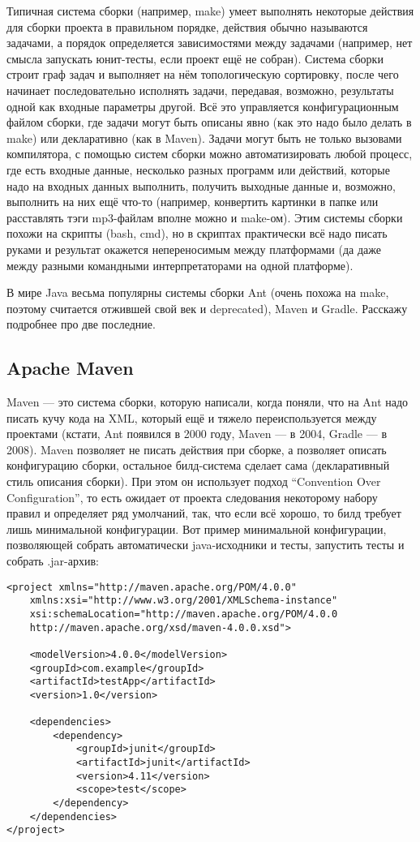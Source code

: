 \documentclass[a5paper]{article}
\begin{document}
Типичная система сборки (например, make) умеет выполнять некоторые действия для сборки проекта в правильном порядке, действия обычно называются задачами, а порядок определяется зависимостями между задачами (например, нет смысла запускать юнит-тесты, если проект ещё не собран). Система сборки строит граф задач и выполняет на нём топологическую сортировку, после чего начинает последовательно исполнять задачи, передавая, возможно, результаты одной как входные параметры другой. Всё это управляется конфигурационным файлом сборки, где задачи могут быть описаны явно (как это надо было делать в make) или декларативно (как в Maven). Задачи могут быть не только вызовами компилятора, с помощью систем сборки можно автоматизировать любой процесс, где есть входные данные, несколько разных программ или действий, которые надо на входных данных выполнить, получить выходные данные и, возможно, выполнить на них ещё что-то (например, конвертить картинки в папке или расставлять тэги mp3-файлам вполне можно и make-ом). Этим системы сборки похожи на скрипты (bash, cmd), но в скриптах практически всё надо писать руками и результат окажется непереносимым между платформами (да даже между разными командными интерпретаторами на одной платформе).

В мире Java весьма популярны системы сборки Ant (очень похожа на make, поэтому считается отжившей свой век и deprecated), Maven и Gradle. Расскажу подробнее про две последние.

\subsection{Apache Maven}

Maven --- это система сборки, которую написали, когда поняли, что на Ant надо писать кучу кода на XML, который ещё и тяжело переиспользуется между проектами (кстати, Ant появился в 2000 году, Maven --- в 2004, Gradle --- в 2008). Maven позволяет не писать действия при сборке, а позволяет описать конфигурацию сборки, остальное билд-система сделает сама (декларативный стиль описания сборки). При этом он использует подход ``Convention Over Configuration'', то есть ожидает от проекта следования некоторому набору правил и определяет ряд умолчаний, так, что если всё хорошо, то билд требует лишь минимальной конфигурации. Вот пример минимальной конфигурации, позволяющей собрать автоматически java-исходники и тесты, запустить тесты и собрать .jar-архив:

\begin{verbatim}
<project xmlns="http://maven.apache.org/POM/4.0.0" 
    xmlns:xsi="http://www.w3.org/2001/XMLSchema-instance"
    xsi:schemaLocation="http://maven.apache.org/POM/4.0.0
    http://maven.apache.org/xsd/maven-4.0.0.xsd">

    <modelVersion>4.0.0</modelVersion>
    <groupId>com.example</groupId>
    <artifactId>testApp</artifactId>
    <version>1.0</version>

    <dependencies>
        <dependency>
            <groupId>junit</groupId>
            <artifactId>junit</artifactId>
            <version>4.11</version>
            <scope>test</scope>
        </dependency>
    </dependencies>
</project>
\end{verbatim}
\end{document}

